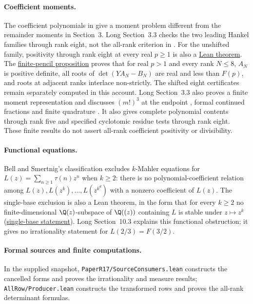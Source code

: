 \documentclass[11pt]{article}
\newcommand{\latecommit}{7380b7871687b6bcc41ca0143c61f232e8af6500}
\newcommand{\laterepobase}{https://github.com/wcook04/plectis-erdos/blob/\latecommit}
\begin{document}
\paragraph{Coefficient moments.}
The coefficient polynomials in \cite[Sec.~3, p.~5]{zudilin2016} give a
moment problem different from the remainder moments in Section~3.
Long Section~3.3 checks the two leading Hankel families through rank eight,
not the all-rank criterion in \cite[Lemma~2.1, p.~4]{wangzhu2016}.
For the unshifted family, positivity through rank eight at every real
$p\ge1$ is also a
\href{\laterepobase/lean/ErdosProblems/Erdos1049/PaperR20/HankelKroneckerCertificate.lean\#L458}{Lean theorem}.
The \href{\laterepobase/lean/ErdosProblems/Erdos1049/PaperR20/FinitePencilProposition.lean\#L43}{finite-pencil proposition} proves that for real $p>1$ and every rank $N\le8$,
$A_N$ is positive definite, all roots of $\det(YA_N-B_N)$ are real and
less than $F(p)$, and roots at adjacent ranks interlace non-strictly.
The shifted eight certificates remain separately computed in this account.
Long Section~3.3 also proves a finite moment representation and discusses $(m!)^3$ at the
endpoint \cite[Thm.~5.1]{berg2007}, formal continued fractions and finite
quadrature \cite{sw2024,golubwelsch1969}. It also gives complete polynomial
contents through rank five and specified cyclotomic residue tests through
rank eight. These finite results do not assert all-rank coefficient
positivity or divisibility.

\paragraph{Functional equations.}
Bell and Smertnig's classification
\cite[Thm.~1.3 and the consequences on p.~3]{bellsmertnig2026}
excludes $k$-Mahler equations for $L(z)=\sum_{n\ge1}\tau(n)z^n$ when
$k\ge2$: there is no polynomial-coefficient relation among
$L(z),L(z^k),\ldots,L(z^{k^d})$ with a nonzero coefficient of $L(z)$.
The single-base exclusion is also a Lean theorem, in the form that for
every $k\ge2$ no finite-dimensional $\Q(z)$-subspace of $\Q((z))$
containing $L$ is stable under $z\mapsto z^k$
(\href{\laterepobase/lean/ErdosProblems/Erdos1049/PaperCompleteR21/SimultaneousMahlerSystemUnconditional.lean\#L263}{single-base statement}).
Long Section~10.3 explains this functional obstruction; it gives no
irrationality statement for $L(2/3)=F(3/2)$.

\paragraph{Formal sources and finite computations.}
\begingroup
\raggedright
In the supplied snapshot, \texttt{PaperR17/SourceConsumers.lean}
constructs the cancelled forms
and proves the irrationality and measure results;
\texttt{AllRow/Producer.lean} constructs the transformed rows and
proves the all-rank determinant formulas.
\end{document}
